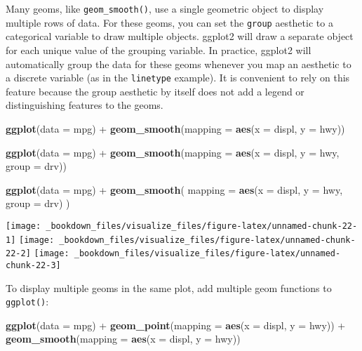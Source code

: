 \documentclass[]{book}
\newenvironment{Shaded}{\begin{snugshade}}{\end{snugshade}}
\newcommand{\KeywordTok}[1]{\textcolor[rgb]{0.13,0.29,0.53}{\textbf{{#1}}}}
\newcommand{\DataTypeTok}[1]{\textcolor[rgb]{0.13,0.29,0.53}{{#1}}}
\newcommand{\StringTok}[1]{\textcolor[rgb]{0.31,0.60,0.02}{{#1}}}
\newcommand{\NormalTok}[1]{{#1}}
\begin{document}
Many geoms, like \texttt{geom\_smooth()}, use a single geometric object
to display multiple rows of data. For these geoms, you can set the
\texttt{group} aesthetic to a categorical variable to draw multiple
objects. ggplot2 will draw a separate object for each unique value of
the grouping variable. In practice, ggplot2 will automatically group the
data for these geoms whenever you map an aesthetic to a discrete
variable (as in the \texttt{linetype} example). It is convenient to rely
on this feature because the group aesthetic by itself does not add a
legend or distinguishing features to the geoms.

\begin{Shaded}
\begin{Highlighting}[]
\KeywordTok{ggplot}\NormalTok{(}\DataTypeTok{data =} \NormalTok{mpg) +}
\StringTok{  }\KeywordTok{geom_smooth}\NormalTok{(}\DataTypeTok{mapping =} \KeywordTok{aes}\NormalTok{(}\DataTypeTok{x =} \NormalTok{displ, }\DataTypeTok{y =} \NormalTok{hwy))}
              
\KeywordTok{ggplot}\NormalTok{(}\DataTypeTok{data =} \NormalTok{mpg) +}
\StringTok{  }\KeywordTok{geom_smooth}\NormalTok{(}\DataTypeTok{mapping =} \KeywordTok{aes}\NormalTok{(}\DataTypeTok{x =} \NormalTok{displ, }\DataTypeTok{y =} \NormalTok{hwy, }\DataTypeTok{group =} \NormalTok{drv))}
    
\KeywordTok{ggplot}\NormalTok{(}\DataTypeTok{data =} \NormalTok{mpg) +}
\StringTok{  }\KeywordTok{geom_smooth}\NormalTok{(}
    \DataTypeTok{mapping =} \KeywordTok{aes}\NormalTok{(}\DataTypeTok{x =} \NormalTok{displ, }\DataTypeTok{y =} \NormalTok{hwy, }\DataTypeTok{group =} \NormalTok{drv)}
  \NormalTok{)}
\end{Highlighting}
\end{Shaded}

\texttt{[image: \_bookdown\_files/visualize\_files/figure-latex/unnamed-chunk-22-1]}
\texttt{[image: \_bookdown\_files/visualize\_files/figure-latex/unnamed-chunk-22-2]}
\texttt{[image: \_bookdown\_files/visualize\_files/figure-latex/unnamed-chunk-22-3]}

To display multiple geoms in the same plot, add multiple geom functions
to \texttt{ggplot()}:

\begin{Shaded}
\begin{Highlighting}[]
\KeywordTok{ggplot}\NormalTok{(}\DataTypeTok{data =} \NormalTok{mpg) +}\StringTok{ }
\StringTok{  }\KeywordTok{geom_point}\NormalTok{(}\DataTypeTok{mapping =} \KeywordTok{aes}\NormalTok{(}\DataTypeTok{x =} \NormalTok{displ, }\DataTypeTok{y =} \NormalTok{hwy)) +}
\StringTok{  }\KeywordTok{geom_smooth}\NormalTok{(}\DataTypeTok{mapping =} \KeywordTok{aes}\NormalTok{(}\DataTypeTok{x =} \NormalTok{displ, }\DataTypeTok{y =} \NormalTok{hwy))}
\end{Highlighting}
\end{Shaded}
\end{document}
